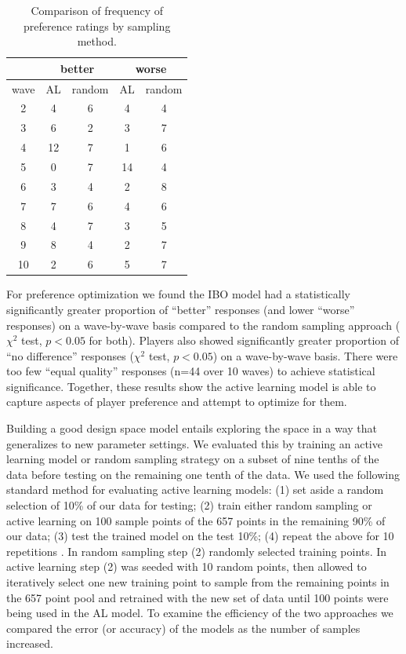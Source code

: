 \documentclass{sig-alternate}
\begin{document}
\begin{table}[tb]
\centering
\begin{tabular}{|c|cc|cc|}
\hline  & \multicolumn{2}{|c|}{better} & \multicolumn{2}{|c|}{worse}  \\ 
\hline wave & AL & random & AL & random \\ 
\hline 2 & 4 & 6 & 4 & 4 \\ 
\hline 3 & 6 & 2 & 3 & 7 \\ 
\hline 4 & 12 & 7 & 1 & 6 \\ 
\hline 5 & 0 & 7 & 14 & 4 \\ 
\hline 6 & 3 & 4 & 2 & 8 \\ 
\hline 7 & 7 & 6 & 4 & 6 \\ 
\hline 8 & 4 & 7 & 3 & 5 \\ 
\hline 9 & 8 & 4 & 2 & 7 \\ 
\hline 10 & 2 & 6 & 5 & 7 \\ 
\hline 
\end{tabular}
\caption{Comparison of frequency of preference ratings by sampling method.}
\label{tab:pref_proportion}
\end{table}

For preference optimization we found the IBO model had a statistically significantly greater proportion of ``better'' responses (and lower ``worse'' responses) on a wave-by-wave basis compared to the random sampling approach ($\chi^2$ test, $p<0.05$ for both). Players also showed significantly greater proportion of ``no difference'' responses ($\chi^2$ test, $p<0.05$) on a wave-by-wave basis. There were too few ``equal quality'' responses (n=44 over 10 waves) to achieve statistical significance. Together, these results show the active learning model is able to capture aspects of player preference and attempt to optimize for them.

Building a good design space model entails exploring the space in a way that generalizes to new parameter settings. We evaluated this by training an active learning model or random sampling strategy on a subset of nine tenths of the data before testing on the remaining one tenth of the data. We used the following standard method for evaluating active learning models: (1) set aside a random selection of 10\% of our data for testing; (2) train either random sampling or active learning on 100 sample points of the 657 points in the remaining 90\% of our data; (3) test the trained model on the test 10\%; (4) repeat the above for 10 repetitions \cite{settles2012:al-book}. In random sampling step (2) randomly selected training points. In active learning step (2) was seeded with 10 random points, then allowed to iteratively select one new training point to sample from the remaining points in the 657 point pool and retrained with the new set of data until 100 points were being used in the AL model. To examine the efficiency of the two approaches we compared the error (or accuracy) of the models as the number of samples increased.
\end{document}
